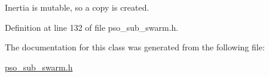 Inertia is mutable, so a copy is created. 



Definition at line 132 of file pso\+\_\+sub\+\_\+swarm.\+h.



The documentation for this class was generated from the following file\+:\begin{DoxyCompactItemize}
\item 
\hyperlink{pso__sub__swarm_8h}{pso\+\_\+sub\+\_\+swarm.\+h}\end{DoxyCompactItemize}
